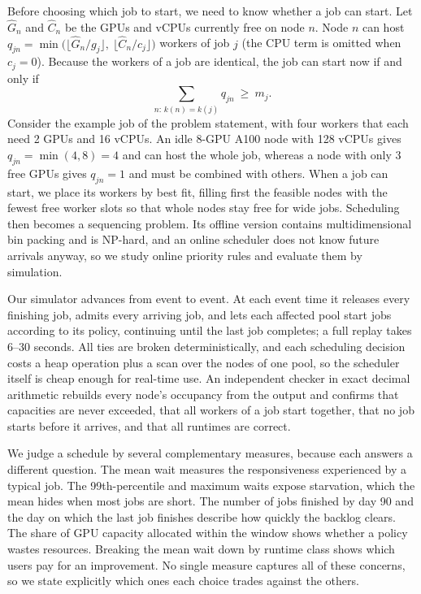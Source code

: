 \documentclass[11pt,a4paper]{article}
\begin{document}
Before choosing which job to start, we need to know whether a job can start. Let $\hat G_n$ and $\hat C_n$ be the GPUs and vCPUs currently free on node $n$. Node $n$ can host $q_{jn}=\min\big(\lfloor \hat G_n/g_j\rfloor,\ \lfloor \hat C_n/c_j\rfloor\big)$ workers of job $j$ (the CPU term is omitted when $c_j=0$). Because the workers of a job are identical, the job can start now if and only if
\begin{equation}
\textstyle\sum_{n:\,k(n)=k(j)} q_{jn}\ \ge\ m_j .
\end{equation}
Consider the example job of the problem statement, with four workers that each need 2 GPUs and 16 vCPUs. An idle 8-GPU A100 node with 128 vCPUs gives $q_{jn}=\min(4,8)=4$ and can host the whole job, whereas a node with only 3 free GPUs gives $q_{jn}=1$ and must be combined with others. When a job can start, we place its workers by best fit, filling first the feasible nodes with the fewest free worker slots so that whole nodes stay free for wide jobs. Scheduling then becomes a sequencing problem. Its offline version contains multidimensional bin packing and is NP-hard, and an online scheduler does not know future arrivals anyway, so we study online priority rules and evaluate them by simulation.

Our simulator advances from event to event. At each event time it releases every finishing job, admits every arriving job, and lets each affected pool start jobs according to its policy, continuing until the last job completes; a full replay takes 6--30 seconds. All ties are broken deterministically, and each scheduling decision costs a heap operation plus a scan over the nodes of one pool, so the scheduler itself is cheap enough for real-time use. An independent checker in exact decimal arithmetic rebuilds every node's occupancy from the output and confirms that capacities are never exceeded, that all workers of a job start together, that no job starts before it arrives, and that all runtimes are correct.

We judge a schedule by several complementary measures, because each answers a different question. The mean wait measures the responsiveness experienced by a typical job. The 99th-percentile and maximum waits expose starvation, which the mean hides when most jobs are short. The number of jobs finished by day 90 and the day on which the last job finishes describe how quickly the backlog clears. The share of GPU capacity allocated within the window shows whether a policy wastes resources. Breaking the mean wait down by runtime class shows which users pay for an improvement. No single measure captures all of these concerns, so we state explicitly which ones each choice trades against the others.
\end{document}
